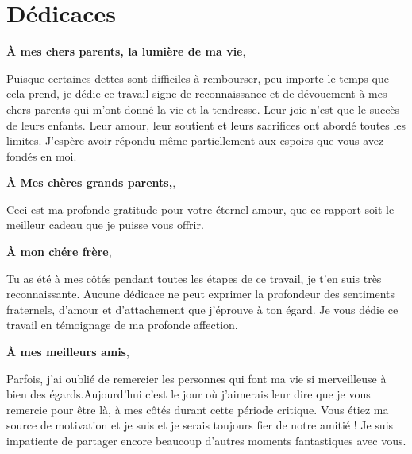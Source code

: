 \chapter*{Dédicaces}
\begin{center}
\center \textbf{À mes chers parents, la lumière de ma vie},
\vspace{1mm}

\normalsize Puisque certaines dettes sont difficiles à rembourser, peu importe le temps que cela prend, je dédie ce
travail signe de reconnaissance et de dévouement à mes chers parents qui m’ont donné la vie et la tendresse. Leur joie n’est que le succès de leurs enfants. Leur amour, leur soutient et leurs sacrifices ont
abordé toutes les limites. J’espère avoir répondu même partiellement aux espoirs que vous avez fondés
en moi.


\center \textbf{À Mes chères grands parents,},
\vspace{1mm}

\normalsize Ceci est ma profonde gratitude pour votre éternel amour, que ce rapport soit le meilleur cadeau que je
puisse vous offrir. 


\center \textbf{À mon chére frère},
\vspace{1mm}

\normalsize Tu as été à mes côtés pendant toutes les étapes de ce travail, je t’en suis très reconnaissante. Aucune
dédicace ne peut exprimer la profondeur des sentiments fraternels, d’amour et d’attachement que
j’éprouve à ton égard. Je vous dédie ce travail en témoignage de ma profonde affection. 


\center \textbf{À mes meilleurs amis},
\vspace{1mm}

\normalsize Parfois, j'ai oublié de remercier les personnes qui font ma vie si merveilleuse à bien des
égards.Aujourd'hui c'est le jour où j'aimerais leur dire que je vous remercie pour être là, à mes côtés durant cette période critique. Vous étiez ma source de motivation et je suis et je serais toujours fier de notre amitié !
Je suis impatiente de partager encore beaucoup d'autres moments fantastiques avec vous. 


\begin{flushright}
    \LARGE \@author
\end{flushright}
\end{center}











